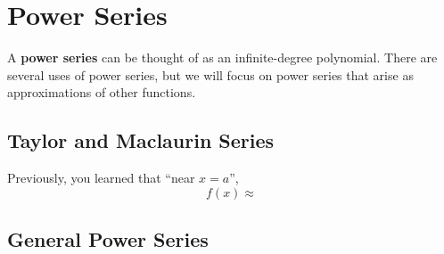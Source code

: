 \section{Power Series}

A \textbf{power series} can  be thought of as an infinite-degree polynomial. There are several uses of power series, but we will focus on power series that arise as approximations of other functions.


\subsection{Taylor and Maclaurin Series}
Previously, you learned that ``near $x=a$'',
$$f(x)\approx $$




\subsection{General Power Series}